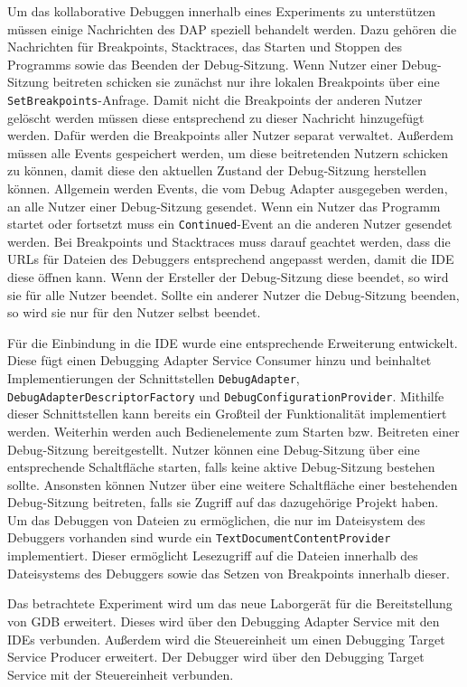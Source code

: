 Um das kollaborative Debuggen innerhalb eines Experiments zu unterstützen müssen einige Nachrichten des \ac{DAP} speziell behandelt werden. Dazu gehören die Nachrichten für Breakpoints, Stacktraces, das Starten und Stoppen des Programms sowie das Beenden der Debug-Sitzung. Wenn Nutzer einer Debug-Sitzung beitreten schicken sie zunächst nur ihre lokalen Breakpoints über eine \texttt{SetBreakpoints}-Anfrage. Damit nicht die Breakpoints der anderen Nutzer gelöscht werden müssen diese entsprechend zu dieser Nachricht hinzugefügt werden. Dafür werden die Breakpoints aller Nutzer separat verwaltet. Außerdem müssen alle Events gespeichert werden, um diese beitretenden Nutzern schicken zu können, damit diese den aktuellen Zustand der Debug-Sitzung herstellen können. Allgemein werden Events, die vom Debug Adapter ausgegeben werden, an alle Nutzer einer Debug-Sitzung gesendet. Wenn ein Nutzer das Programm startet oder fortsetzt muss ein \texttt{Continued}-Event an die anderen Nutzer gesendet werden. Bei Breakpoints und Stacktraces muss darauf geachtet werden, dass die URLs für Dateien des Debuggers entsprechend angepasst werden, damit die IDE diese öffnen kann. Wenn der Ersteller der Debug-Sitzung diese beendet, so wird sie für alle Nutzer beendet. Sollte ein anderer Nutzer die Debug-Sitzung beenden, so wird sie nur für den Nutzer selbst beendet.

Für die Einbindung in die IDE wurde eine entsprechende Erweiterung entwickelt. Diese fügt einen Debugging Adapter Service Consumer hinzu und beinhaltet Implementierungen der Schnittstellen \texttt{DebugAdapter}, \texttt{DebugAdapterDescriptorFactory} und \texttt{DebugConfigurationProvider}. Mithilfe dieser Schnittstellen kann bereits ein Großteil der Funktionalität implementiert werden. Weiterhin werden auch Bedienelemente zum Starten bzw. Beitreten einer Debug-Sitzung bereitgestellt. Nutzer können eine Debug-Sitzung über eine entsprechende Schaltfläche starten, falls keine aktive Debug-Sitzung bestehen sollte. Ansonsten können Nutzer über eine weitere Schaltfläche einer bestehenden Debug-Sitzung beitreten, falls sie Zugriff auf das dazugehörige Projekt haben. Um das Debuggen von Dateien zu ermöglichen, die nur im Dateisystem des Debuggers vorhanden sind wurde ein \texttt{TextDocumentContentProvider} implementiert. Dieser ermöglicht Lesezugriff auf die Dateien innerhalb des Dateisystems des Debuggers sowie das Setzen von Breakpoints innerhalb dieser.

Das betrachtete Experiment wird um das neue Laborgerät für die Bereitstellung von GDB erweitert. Dieses wird über den Debugging Adapter Service mit den IDEs verbunden. Außerdem wird die Steuereinheit um einen Debugging Target Service Producer erweitert. Der Debugger wird über den Debugging Target Service mit der Steuereinheit verbunden.